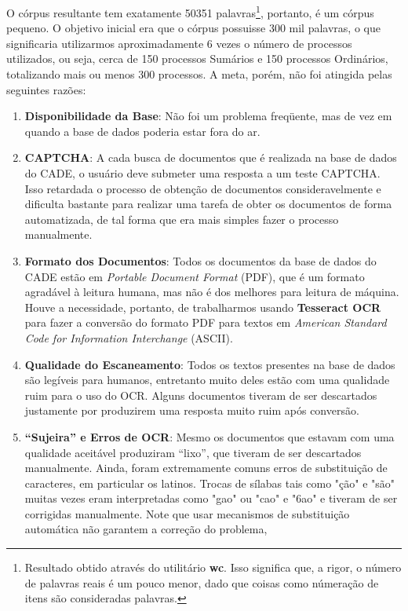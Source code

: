\documentclass[11pt]{report}
\newcommand{\quotes}[1]{``#1''}
\begin{document}
O córpus resultante tem exatamente 50351 palavras\footnote[2]{Resultado obtido através do utilitário \textbf{wc}. Isso significa que, a rigor, o número de palavras
reais é um pouco menor, dado que coisas como númeração de itens são consideradas palavras.}, portanto, é um córpus pequeno. O objetivo inicial era que o córpus
possuisse 300 mil palavras, o que significaria utilizarmos aproximadamente 6 vezes o número de processos utilizados, ou seja, cerca de 150 processos Sumários e
150 processos Ordinários, totalizando mais ou menos 300 processos. A meta, porém, não foi atingida pelas seguintes razões:

\begin{enumerate}[label=\textbf{\arabic*.}]
  \item \textbf{Disponibilidade da Base}: Não foi um problema freqüente, mas de vez em quando a base de dados poderia estar fora do ar.
  \item \textbf{CAPTCHA}: A cada busca de documentos que é realizada na base de dados do CADE, o usuário deve submeter uma resposta a um teste CAPTCHA. Isso
  retardada o processo de obtenção de documentos consideravelmente e dificulta bastante para realizar uma tarefa de obter os documentos de forma automatizada, de tal
  forma que era mais simples fazer o processo manualmente.
  \item \textbf{Formato dos Documentos}: Todos os documentos da base de dados do CADE estão em \textit{Portable Document Format} (PDF), que é um formato agradável à
  leitura humana, mas não é dos melhores para leitura de máquina. Houve a necessidade, portanto,  de trabalharmos usando \textbf{Tesseract OCR} para fazer a conversão do
  formato PDF para textos em \textit{American Standard Code for Information Interchange} (ASCII).
  \item \textbf{Qualidade do Escaneamento}: Todos os textos presentes na base de dados são legíveis para humanos, entretanto muito deles estão com uma qualidade ruim para
  o uso do OCR. Alguns documentos tiveram de ser descartados justamente por produzirem uma resposta muito ruim após conversão.
  \item \textbf{\quotes{Sujeira} e Erros de OCR}: Mesmo os documentos que estavam com uma qualidade aceitável produziram \quotes{lixo}, que tiveram de ser descartados
  manualmente. Ainda, foram extremamente comuns erros de substituição de caracteres, em particular os latinos. Trocas de sílabas tais como "ção" e "são" muitas vezes eram
  interpretadas como "gao" ou "cao" e "6ao" e tiveram de ser corrigidas manualmente. Note que usar mecanismos de substituição automática não garantem a correção do problema,

\end{enumerate}
\end{document}
